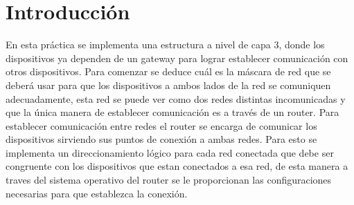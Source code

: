 \section*{Introducci\'on}

{
    En esta pr\'actica se implementa una estructura a nivel de capa 3, donde los dispositivos ya dependen de
    un gateway para lograr establecer comunicaci\'on con otros dispositivos. Para comenzar se deduce cu\'al es
    la m\'ascara de red que se deber\'a usar para que los dispositivos a ambos lados de la red se comuniquen 
    adecuadamente, esta red se puede ver como dos redes distintas incomunicadas y que la \'unica manera de establecer
    comunicaci\'on es a trav\'es de un router. \newline
    \newline
    Para establecer comunicaci\'on entre redes el router se encarga de comunicar los dispositivos sirviendo sus puntos de 
    conexi\'on a ambas redes. Para esto se implementa un direccionamiento l\'ogico para cada red conectada que debe ser 
    congruente con los dispositivos que estan conectados a esa red, de esta manera a traves del sistema operativo del router
    se le proporcionan las configuraciones necesarias para que establezca la conexi\'on. 
}